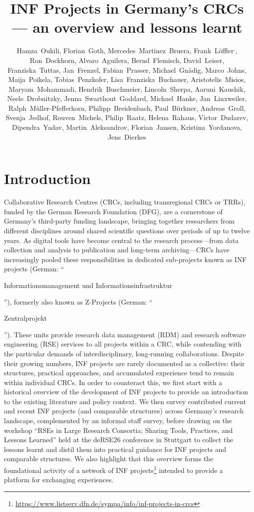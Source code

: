 \documentclass{eceasst}
\title{INF Projects in Germany's CRCs --- an overview and lessons learnt}
\author{
Hamza~Oukili\authorOrcid{0000-0003-4695-8532}\authorRef{1},
Florian~Goth\authorOrcid{0000-0003-2707-4790}\authorRef{2},
Mercedes~Martinez~Bruera\authorOrcid{0009-0004-2891-7045}\authorRef{3},
Frank~Löffler\authorOrcid{0000-0001-6643-6323}\authorRef{4}${}^,$\authorRef{5},
Ron~Dockhorn\authorOrcid{0000-0002-5268-5430}\authorRef{6},
Alvaro~Aguilera\authorOrcid{0000-0001-9324-8555}\authorRef{6},
Bernd~Flemisch\authorOrcid{0000-0001-8188-620X}\authorRef{1},
David~Leiser\authorOrcid{0000-0003-0949-8194}\authorRef{7},
Franziska~Tuttas\authorOrcid{0000-0003-3898-0908}\authorRef{7},
Jan~Frenzel\authorOrcid{0009-0007-5755-1427}\authorRef{6},
Fabian~Prasser\authorOrcid{0000-0003-3172-3095}\authorRef{8},
Michael~Gnädig\authorRef{8},
Marco~Johns\authorOrcid{0000-0003-4706-6595}\authorRef{8},
Maija~Poikela\authorOrcid{0000-0003-2616-4401}\authorRef{8}, 
Tobias~Penzkofer\authorOrcid{0000-0001-9591-8575}\authorRef{9}, 
Lisa~Franziska~Buchauer\authorOrcid{0000-0002-4722-8390}\authorRef{9},
Aristotelis~Misios\authorRef{9},
Maryam~Mohammadi\authorOrcid{0009-0007-8747-029X}\authorRef{10},
Hendrik~Buschmeier\authorOrcid{0000-0002-9613-5713}\authorRef{10},
Lincoln~Sherpa\authorOrcid{0009-0000-3287-0295}\authorRef{6},
Aaruni~Kaushik\authorOrcid{0009-0006-3061-6553}\authorRef{11},
Neele~Drobnitzky\authorOrcid{0000-0002-3181-941X}\authorRef{12},
Jenna~Swarthout~Goddard\authorOrcid{0000-0002-0181-0828}\authorRef{13},
Michael~Hanke\authorOrcid{0000-0001-6398-6370}\authorRef{13},
Jan~Linxweiler\authorOrcid{0000-0002-2755-5087}\authorRef{14},
Ralph~Müller-Pfefferkorn\authorOrcid{0000-0001-8719-5741}\authorRef{6},
Philipp~Breidenbach\authorOrcid{0000-0002-1506-7350}\authorRef{15},
Paul~Bürkner\authorOrcid{0000-0001-5765-8995}\authorRef{16},
Andreas~Groll\authorOrcid{0000-0001-6787-9118}\authorRef{16},
Svenja~Jedhof\authorOrcid{0009-0008-2939-9103}\authorRef{16},
Rouven~Michels\authorOrcid{0000-0002-5433-6197}\authorRef{16},
Philip~Raatz\authorOrcid{0000-0002-9133-0077}\authorRef{15},
Helena~Rahaus\authorOrcid{0009-0009-8843-8528}\authorRef{15},
Victor~Dudarev\authorOrcid{0000-0001-7243-9096}\authorRef{17},
Dipendra~Yadav\authorOrcid{0009-0004-4629-1277}\authorRef{18},
Martin~Aleksandrov\authorOrcid{0000-0003-0047-1235}\authorRef{19},
Florian~Jansen\authorOrcid{0000-0002-0331-5185}\authorRef{19},
Kristina~Yordanova\authorOrcid{0000-0002-6428-1062}\authorRef{18},
Jens~Dierkes\authorOrcid{0000-0002-0121-9261}\authorRef{20}
} %
\institute{%
\autlabel{1} Institute for Modeling Hydraulic and Environmental Systems (IWS), University of Stuttgart,
\autlabel{2} Institut für theoretische Physik 1, University of Würzburg,
\autlabel{3} Goethe-Universität Frankfurt am Main,
\autlabel{4} Heinz Nixdorf Chair for Distributed Information Systems, Friedrich Schiller University Jena,
\autlabel{5} de-RSE e.V. --- Society for Research Software in Germany,
\autlabel{6} Center for Interdisciplinary Digital Sciences, Technische Universität Dresden,
\autlabel{7} Institute of Space Systems (IRS), University of Stuttgart,
\autlabel{8} Berlin Institute of Health at Charité - Universitätsmedizin Berlin,
\autlabel{9} Charité - Universitätsmedizin Berlin,
\autlabel{10} Department of Linguistics, Bielefeld University, Bielefeld,
\autlabel{11} Fachbereich Mathematik, RPTU University Kaiserslautern-Landau, Kaiserslautern,
\autlabel{12} Heidelberg University Biochemistry Center (BZH), Heidelberg,
\autlabel{13} Forschungszentrum Jülich,
\autlabel{14} Technische Universität Braunschweig,
\autlabel{15} RWI - Leibniz Institute for Economic Research: Essen,
\autlabel{16} TU Dortmund University, Dortmund,
\autlabel{17} Materials Discovery and Interfaces (MDI), Ruhr University Bochum,
\autlabel{18} Institute of Data Science, University of Greifswald,
\autlabel{19} Faculty for Agriculture, Civil and Environmental Engineering, University of Rostock,
\autlabel{20} Universitäts- und Stadtbibliothek Köln, Universität zu Köln
}
\newenvironment{de}{\begin{otherlanguage}{ngerman}}{\end{otherlanguage}}
\begin{document}
\maketitle

\section{Introduction}

Collaborative Research Centres (CRCs, including transregional CRCs or TRRs), funded by the German Research Foundation (DFG), are a cornerstone of Germany's third-party funding landscape, bringing together researchers from different disciplines around shared scientific questions over periods of up to twelve years.
As digital tools have become central to the research process---from data collection and analysis to publication and long-term archiving---CRCs have increasingly pooled these responsibilities in dedicated sub-projects known as INF projects (German: ``\begin{de}Informationsmanagement und Informationsinfrastruktur\end{de}''), formerly also known as Z-Projects (German: ``\begin{de}Zentralprojekt\end{de}'').
These units provide research data management (RDM) and research software engineering (RSE) services to all projects within a CRC, while contending with the particular demands of interdisciplinary, long-running collaborations.
Despite their growing numbers, INF projects are rarely documented as a collective: their structures, practical approaches, and accumulated experience tend to remain within individual CRCs.
In order to counteract this, we first start with a historical overview of the development of INF projects to provide an introduction to the existing literature and policy context.
We then survey contributed current and recent INF projects (and comparable structures) across Germany's research landscape, complemented by an informal staff survey, before drawing on the workshop ``RSEs in Large Research Consortia: Sharing Tools, Practices, and Lessons Learned'' held at the deRSE26 conference in Stuttgart to collect the lessons learnt and distil them into practical guidance for INF projects and comparable structures.
We also highlight that this overview forms the foundational activity of
a network of INF projects\footnote{%
\url{https://www.listserv.dfn.de/sympa/info/inf-projects-in-crcs}%
} intended to provide a platform for exchanging experiences.
\end{document}
